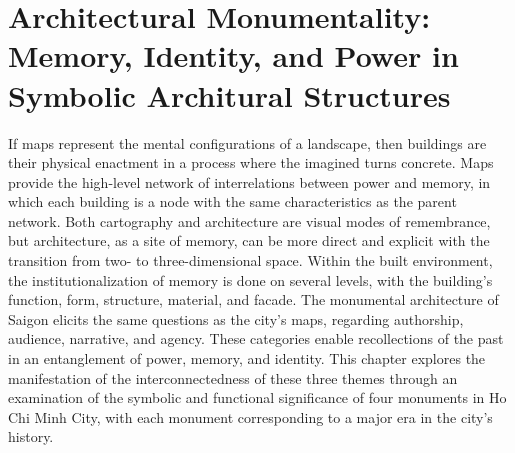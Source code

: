 \chapter[Architectural Monumentality]{Architectural Monumentality: Memory, Identity, and Power in Symbolic Architural Structures}\label{symbol}
If maps represent the mental configurations of a landscape, then buildings are their physical enactment in a process where the imagined turns concrete. Maps provide the high-level network of interrelations between power and memory, in which each building is a node with the same characteristics as the parent network. Both cartography and architecture are visual modes of remembrance, but architecture, as a site of memory, can be more direct and explicit with the transition from two- to three-dimensional space. Within the built environment, the institutionalization of memory is done on several levels, with the building’s function, form, structure, material, and facade. The monumental architecture of Saigon elicits the same questions as the city’s maps, regarding authorship, audience, narrative, and agency. These categories enable recollections of the past in an entanglement of power, memory, and identity. This chapter explores the manifestation of the interconnectedness of these three themes through an examination of the symbolic and functional significance of four monuments in Ho Chi Minh City, with each monument corresponding to a major era in the city’s history.
\vi

